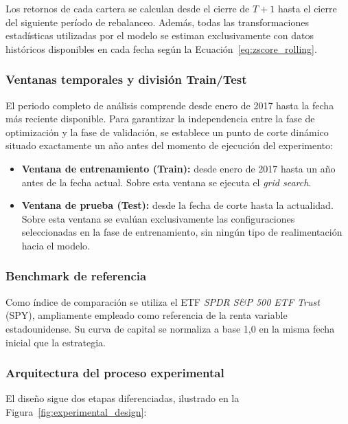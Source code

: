 Los retornos de cada cartera se calculan desde el cierre de
$T+1$ hasta el cierre del siguiente período de rebalanceo.
Además, todas las transformaciones estadísticas utilizadas por
el modelo se estiman
exclusivamente con datos históricos disponibles en cada fecha
según la Ecuación~\ref{eq:zscore_rolling}.

\subsubsection{Ventanas temporales y división Train/Test}

El periodo completo de análisis comprende desde enero de 2017
hasta la fecha más reciente disponible. Para garantizar la
independencia entre la fase de optimización y la fase de
validación, se establece un punto de corte dinámico situado
exactamente un año antes del momento de ejecución del
experimento:

\begin{itemize}
    \item \textbf{Ventana de entrenamiento (Train):}
    desde enero de 2017 hasta un año antes de la fecha actual.
    Sobre esta ventana se ejecuta el \textit{grid search}.
    \item \textbf{Ventana de prueba (Test):}
    desde la fecha de corte hasta la actualidad. Sobre esta
    ventana se evalúan exclusivamente las configuraciones
    seleccionadas en la fase de entrenamiento, sin ningún tipo
    de realimentación hacia el modelo.
\end{itemize}

\subsubsection{Benchmark de referencia}

Como índice de comparación se utiliza el ETF \textit{SPDR
S\&P 500 ETF Trust} (SPY), ampliamente empleado como referencia de la renta variable estadounidense. Su curva de
capital se normaliza a base 1,0 en la misma fecha inicial que la
estrategia.

\subsubsection{Arquitectura del proceso experimental}

El diseño sigue dos etapas diferenciadas, ilustrado en la
Figura~\ref{fig:experimental_design}:

